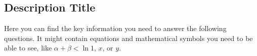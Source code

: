 \subsection*{Description Title}
Here you can find the key information you need to answer the following questions.
It might contain equations and mathematical symbols you need to be able to see, like $\alpha + \beta < \ln 1$, $x$, or $y$.